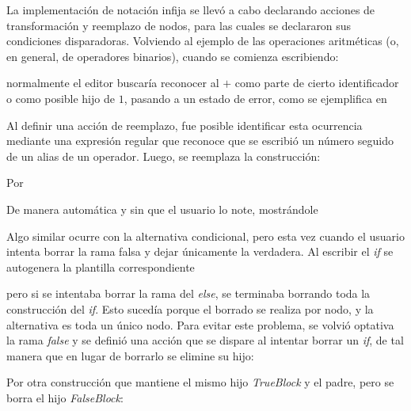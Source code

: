La implementación de notación infija se llevó a cabo declarando acciones de transformación y reemplazo de nodos, para las cuales se declararon sus condiciones disparadoras. 
Volviendo al ejemplo de las operaciones aritméticas (o, en general, de operadores binarios), cuando se comienza escribiendo:

\centertree{
  [1
    [+]
  ]
}



normalmente el editor buscaría reconocer al $+$ como parte de cierto identificador o como posible hijo de $1$, pasando a un estado de error, como se ejemplifica en 


Al definir una acción de reemplazo, fue posible identificar esta ocurrencia mediante una expresión regular que reconoce que se escribió un número seguido de un alias de un operador. Luego, se reemplaza la construcción:

\centertree{
  [1
    [+]
    [empty]
  ]
}

Por 
\centertree{
  [+
    [1]
    [empty]
  ]
}

De manera automática y sin que el usuario lo note, mostrándole 


Algo similar ocurre con la alternativa condicional, pero esta vez cuando el usuario intenta borrar la rama falsa y dejar únicamente la verdadera.
Al escribir el \emph{if} se autogenera la plantilla correspondiente 


pero si se intentaba borrar la rama del \textit{else}, se terminaba borrando toda la construcción del \textit{if}. Esto sucedía porque el borrado se realiza por nodo, y la alternativa es toda un único nodo. Para evitar este problema, se volvió optativa la rama \textit{false} y se definió una acción que se dispare al intentar borrar un \textit{if}, de tal manera que en lugar de borrarlo se elimine su hijo: 

\centertree{
  [IfElseStatement
    [TrueBlock]
    [FalseBlock]
  ]
}

\bigskip

Por otra construcción que mantiene el mismo hijo \textit{TrueBlock} y el padre, pero se borra el hijo \textit{FalseBlock}:

